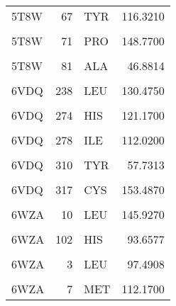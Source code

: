 \begin{table}
\begin{tabular}{lrlr}
			5T8W & 67 & TYR & 116.3210\\
			\addlinespace
			\cellcolor{gray!6}{5T8W} & \cellcolor{gray!6}{68} & \cellcolor{gray!6}{LEU} & \cellcolor{gray!6}{85.5580}\\
			5T8W & 71 & PRO & 148.7700\\
			\cellcolor{gray!6}{5T8W} & \cellcolor{gray!6}{80} & \cellcolor{gray!6}{MET} & \cellcolor{gray!6}{126.3770}\\
			5T8W & 81 & ALA & 46.8814\\
			\cellcolor{gray!6}{5T8W} & \cellcolor{gray!6}{82} & \cellcolor{gray!6}{PHE} & \cellcolor{gray!6}{141.0090}\\
			\addlinespace
			6VDQ & 238 & LEU & 130.4750\\
			\cellcolor{gray!6}{6VDQ} & \cellcolor{gray!6}{271} & \cellcolor{gray!6}{TRP} & \cellcolor{gray!6}{138.8540}\\
			6VDQ & 274 & HIS & 121.1700\\
			\cellcolor{gray!6}{6VDQ} & \cellcolor{gray!6}{277} & \cellcolor{gray!6}{LEU} & \cellcolor{gray!6}{130.8480}\\
			6VDQ & 278 & ILE & 112.0200\\
			\addlinespace
			\cellcolor{gray!6}{6VDQ} & \cellcolor{gray!6}{309} & \cellcolor{gray!6}{THR} & \cellcolor{gray!6}{99.5431}\\
			6VDQ & 310 & TYR & 57.7313\\
			\cellcolor{gray!6}{6VDQ} & \cellcolor{gray!6}{313} & \cellcolor{gray!6}{HIS} & \cellcolor{gray!6}{123.2950}\\
			6VDQ & 317 & CYS & 153.4870\\
			\cellcolor{gray!6}{6VDQ} & \cellcolor{gray!6}{320} & \cellcolor{gray!6}{PHE} & \cellcolor{gray!6}{123.1650}\\
			\addlinespace
			6WZA & 10 & LEU & 145.9270\\
			\cellcolor{gray!6}{6WZA} & \cellcolor{gray!6}{101} & \cellcolor{gray!6}{CYS} & \cellcolor{gray!6}{120.0850}\\
			6WZA & 102 & HIS & 93.6577\\
			\cellcolor{gray!6}{6WZA} & \cellcolor{gray!6}{106} & \cellcolor{gray!6}{ARG} & \cellcolor{gray!6}{132.5260}\\
			6WZA & 3 & LEU & 97.4908\\
			\addlinespace
			\cellcolor{gray!6}{6WZA} & \cellcolor{gray!6}{65} & \cellcolor{gray!6}{PHE} & \cellcolor{gray!6}{90.1118}\\
			6WZA & 7 & MET & 112.1700\\

\end{tabular}
\end{table}
